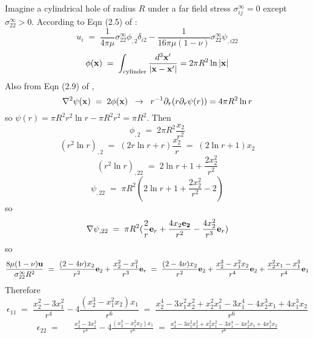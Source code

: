 \documentclass[12pt]{article}
\begin{document}
Imagine a cylindrical hole of radius $R$ under a far field stress
$\sigma_{ij}^\infty=0$ except $\sigma_{22}^\infty>0$.  According to Eqn
(2.5) of \cite{Eshelby57}:
\begin{equation}
 u_i \;=\; \frac{1}{4\pi\mu} \sigma_{22}^\infty \phi_{,2}\delta_{i2} - 
          \frac{1}{16\pi\mu(1-\nu)} \sigma_{22}^\infty \psi_{,i22}
\end{equation}
\begin{equation}
 \phi({\bf x}) \;=\; \int_{\rm cylinder} \frac{d^3{\bf x}'}{|{\bf x}-{\bf x}'|}
 = 2\pi R^2 \ln |{\bf x}|
\end{equation}
Also from Eqn (2.9) of \cite{Eshelby57}, 
\begin{equation}
 \nabla^2 \psi({\bf x}) \;=\; 
 2 \phi({\bf x})  \;\;\rightarrow\;\;
r^{-1} \partial_r ( r \partial_r \psi (r) ) = 4\pi R^2 \ln r
\end{equation}
so $\psi (r) = \pi R^2 r^2\ln r - \pi R^2r^2 =\pi R^2 $. Then
\begin{equation}
 \phi_{,2} \;=\; 2\pi R^2 \frac{x_2}{r^2}
\end{equation}
\begin{equation}
 (r^2\ln r)_{,2} \;=\; (2r\ln r + r)\frac{x_2}{r}
 \;=\; (2\ln r + 1)x_2
\end{equation}
\begin{equation}
 (r^2\ln r)_{,22} \;=\; 2\ln r + 1 + \frac{2x_2^2}{r^2}
\end{equation}
\begin{equation}
 \psi_{,22} \;=\; \pi R^2 (2\ln r + 1 + \frac{2x_2^2}{r^2}  - 2) 
\end{equation}
so 
\begin{equation}
 \nabla\psi_{,22} \;=\; \pi R^2 ( \frac{2}{r} {\bf e}_r + 
\frac{4x_2{\bf e_2}}{r^2} - \frac{4x_2^2}{r^3} {\bf e}_r)
\end{equation}
so 
\begin{equation}
 \frac{8\mu(1-\nu){\bf u}}{\sigma_{22}^\infty R^2} \;=\; 
 \frac{(2-4\nu) x_2}{r^2} {\bf e}_2 + \frac{x_2^2 - x_1^2}{r^3}
 {\bf e}_r \;=\; 
 \frac{(2-4\nu) x_2}{r^2} {\bf e}_2 + \frac{x_2^3 - x_1^2x_2}{r^4} {\bf e}_2
 + \frac{x_2^2 x_1 - x_1^3}{r^4} {\bf e}_1
\end{equation}
Therefore 
\begin{equation}
 \epsilon_{11} \;=\; \frac{x_2^2 - 3x_1^2}{r^4} - 
4\frac{(x_2^3 - x_1^2x_2)x_1}{r^6} \;=\;  
\frac{x_2^4 - 3x_1^2x_2^2 + x_2^2x_1^2 - 3x_1^4 -4x_2^3x_1 + 4 x_1^3x_2}{r^6}
\end{equation}
\begin{eqnarray}
 \epsilon_{22} \;=&& 
\frac{x_2^2 - 3x_1^2}{r^4} - 
4\frac{(x_2^3 - x_1^2x_2)x_1}{r^6} \;=\;  
\frac{x_2^4 - 3x_1^2x_2^2 + x_2^2x_1^2 - 3x_1^4 -4x_2^3x_1 + 4 x_1^3x_2}{r^6}
\end{eqnarray}



\end{document}

